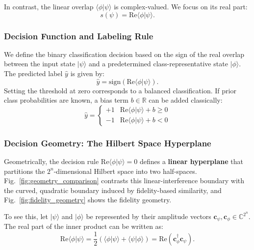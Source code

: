 \documentclass[conference]{IEEEtran}
\begin{document}
In contrast, the linear overlap $\langle \phi | \psi \rangle$ is complex-valued. We focus on its real part:
\begin{equation}
s(\psi) = \mathrm{Re}\langle \phi | \psi \rangle.
\end{equation}

\subsubsection{Decision Function and Labeling Rule}
We define the binary classification decision based on the sign of the real overlap between the input state $|\psi\rangle$ and a predetermined class-representative state $|\phi\rangle$. The predicted label $\hat{y}$ is given by:
\begin{equation}
\hat{y} = \text{sign}\left( \mathrm{Re}\langle \phi | \psi \rangle \right).
\end{equation}
Setting the threshold at zero corresponds to a balanced classification. If prior class probabilities are known, a bias term $b \in \mathbb{R}$ can be added classically:
\begin{equation}
\hat{y} = \begin{cases} +1 & \mathrm{Re}\langle \phi | \psi \rangle + b \geq 0 \\ -1 & \mathrm{Re}\langle \phi | \psi \rangle + b < 0 \end{cases}
\end{equation}

\subsubsection{Decision Geometry: The Hilbert Space Hyperplane}
Geometrically, the decision rule $\mathrm{Re}\langle \phi | \psi \rangle = 0$ defines a \textbf{linear hyperplane} that partitions the $2^n$-dimensional Hilbert space into two half-spaces. Fig.~\ref{fig:geometry_comparison} contrasts this linear-interference boundary with the curved, quadratic boundary induced by fidelity-based similarity, and Fig.~\ref{fig:fidelity_geometry} shows the fidelity geometry.

To see this, let $|\psi\rangle$ and $|\phi\rangle$ be represented by their amplitude vectors $\mathbf{c}_\psi, \mathbf{c}_\phi \in \mathbb{C}^{2^n}$. The real part of the inner product can be written as:
\begin{equation}
\mathrm{Re}\langle \phi | \psi \rangle = \frac{1}{2}\left( \langle \phi | \psi \rangle + \langle \psi | \phi \rangle \right) = \text{Re}(\mathbf{c}_\phi^\dagger \mathbf{c}_\psi).
\end{equation}
\end{document}
